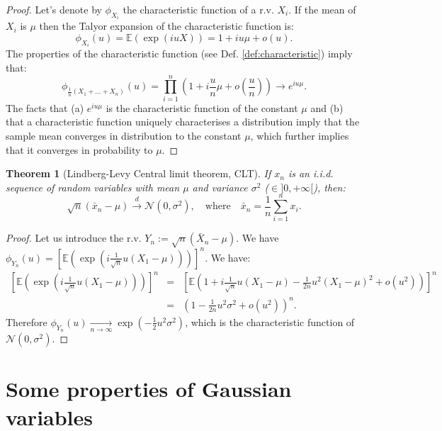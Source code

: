 \documentclass[
  12pt,
]{book}
\newtheorem{theorem}{Theorem}[chapter]
\theoremstyle{definition}
\theoremstyle{definition}
\theoremstyle{definition}
\theoremstyle{definition}
\theoremstyle{remark}
\begin{document}
\begin{proof}
Let's denote by \(\phi_{X_i}\) the characteristic function of a r.v. \(X_i\). If the mean of \(X_i\) is \(\mu\) then the Talyor expansion of the characteristic function is:
\[
\phi_{X_i}(u) = \mathbb{E}(\exp(iuX)) = 1 + iu\mu + o(u).
\]
The properties of the characteristic function (see Def. \ref{def:characteristic}) imply that:
\[
\phi_{\frac{1}{n}(X_1+\dots+X_n)}(u) = \prod_{i=1}^{n} \left(1 + i\frac{u}{n}\mu + o\left(\frac{u}{n}\right) \right) \rightarrow e^{iu\mu}.
\]
The facts that (a) \(e^{iu\mu}\) is the characteristic function of the constant \(\mu\) and (b) that a characteristic function uniquely characterises a distribution imply that the sample mean converges in distribution to the constant \(\mu\), which further implies that it converges in probability to \(\mu\).
\end{proof}

\begin{theorem}[Lindberg-Levy Central limit theorem, CLT]
\protect\hypertarget{thm:LindbergLevyCLT}{}\label{thm:LindbergLevyCLT}If \(x_n\) is an i.i.d. sequence of random variables with mean \(\mu\) and variance \(\sigma^2\) (\(\in ]0,+\infty[\)), then:
\[
\boxed{\sqrt{n} (\bar{x}_n - \mu) \overset{d}{\rightarrow} \mathcal{N}(0,\sigma^2), \quad \mbox{where} \quad \bar{x}_n = \frac{1}{n} \sum_{i=1}^{n} x_i.}
\]
\end{theorem}

\begin{proof}
Let us introduce the r.v. \(Y_n:= \sqrt{n}(\bar{X}_n - \mu)\). We have \(\phi_{Y_n}(u) = \left[ \mathbb{E}\left( \exp(i \frac{1}{\sqrt{n}} u (X_1 - \mu)) \right) \right]^n\). We have:
\begin{eqnarray*}
\left[ \mathbb{E}\left( \exp\left(i \frac{1}{\sqrt{n}} u (X_1 - \mu)\right) \right) \right]^n &=& \left[ \mathbb{E}\left( 1 + i \frac{1}{\sqrt{n}} u (X_1 - \mu) - \frac{1}{2n} u^2 (X_1 - \mu)^2 + o(u^2) \right) \right]^n \\
&=& \left( 1 - \frac{1}{2n}u^2\sigma^2 + o(u^2)\right)^n.
\end{eqnarray*}
Therefore \(\phi_{Y_n}(u) \underset{n \rightarrow \infty}{\rightarrow} \exp \left( - \frac{1}{2}u^2\sigma^2 \right)\), which is the characteristic function of \(\mathcal{N}(0,\sigma^2)\).
\end{proof}

\hypertarget{GaussianVar}{%
\section{Some properties of Gaussian variables}\label{GaussianVar}}
\end{document}
